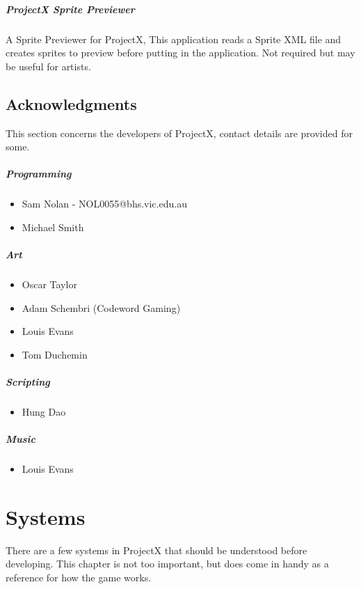 \documentclass{book}
\newenvironment{ulist}
	{\begin{itemize}
			\itemsep0em}
	{\end{itemize}}
\begin{document}
	\paragraph{ProjectX Sprite Previewer}
	A Sprite Previewer for ProjectX, This application reads a Sprite XML file  and creates sprites to preview before putting in the application. Not required but may be useful for artists.
	
	\section{Acknowledgments}
	This section concerns the developers of ProjectX, contact details are provided for some.
	
	\paragraph{Programming}
	\begin{ulist}
		\item Sam Nolan - NOL0055@bhs.vic.edu.au
		\item Michael Smith
	\end{ulist}
	
	\paragraph{Art}
	\begin{ulist}
		\item Oscar Taylor
		\item Adam Schembri (Codeword Gaming)
		\item Louis Evans
		\item Tom Duchemin
	\end{ulist}
	
	\paragraph{Scripting}
	\begin{ulist}
		\item Hung Dao
	\end{ulist}
	
	\paragraph{Music}
	\begin{ulist}
		\item Louis Evans
	\end{ulist}

	\chapter{Systems}
	There are a few systems in ProjectX that should be understood before developing. This chapter is not too important, but does come in handy as a reference for how the game works.
	
\end{document}
